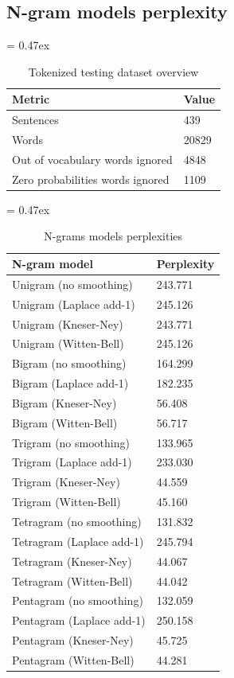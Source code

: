 \subsection{N-gram models perplexity}

\begin{table}[t]
	\caption{Tokenized testing dataset overview}
	\extrarowsep = 0.47ex
	\centering
	\begin{tabu} to 0.33\textwidth { X[5,l,m] X[r,m] }
		\rowfont{\bfseries\itshape} Metric & Value \\
		\hline
		Sentences							&	   439	\\
		Words								&	 20829	\\
		Out of vocabulary words ignored		&	  4848	\\
		Zero probabilities words ignored	&	  1109	\\
	\end{tabu}
	\label{tab:n-grams-models-stats}
\end{table}


\begin{table}[t]
	\caption{N-grams models perplexities}
	\extrarowsep = 0.47ex
	\centering
	\begin{tabu} to 0.29\textwidth { X[2.5,l,m] X[r,m] }
		\rowfont{\bfseries\itshape} N-gram model & Perplexity \\
		\hline
		Unigram (no smoothing)		&	243.771		\\
		Unigram (Laplace add-1)		&	245.126		\\
		Unigram (Kneser-Ney)		&	243.771		\\
		Unigram (Witten-Bell)		&	245.126		\\
		Bigram (no smoothing)		&	164.299		\\
		Bigram (Laplace add-1)		&	182.235		\\
		Bigram (Kneser-Ney)			&	 56.408		\\
		Bigram (Witten-Bell)		&	 56.717		\\
		Trigram (no smoothing)		&	133.965		\\
		Trigram (Laplace add-1)		&	233.030		\\
		Trigram (Kneser-Ney)		&	 44.559		\\
		Trigram (Witten-Bell)		&	 45.160		\\
		Tetragram (no smoothing)	&	131.832		\\
		Tetragram (Laplace add-1)	&	245.794		\\
		Tetragram (Kneser-Ney)		&	 44.067		\\
		Tetragram (Witten-Bell)		&	 44.042		\\
		Pentagram (no smoothing)	&	132.059		\\
		Pentagram (Laplace add-1)	&	250.158		\\
		Pentagram (Kneser-Ney)		&	 45.725		\\
		Pentagram (Witten-Bell)		&	 44.281		\\
	\end{tabu}
	\label{tab:n-grams-models-perplexities}
\end{table}
